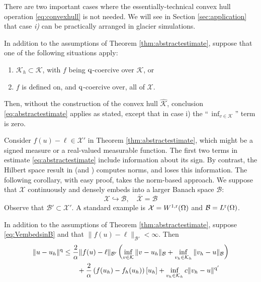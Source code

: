 \documentclass[hidelinks,onefignum,onetabnum,final]{siamart220329}  %
\newcommand{\cB}{\mathcal{B}}
\newcommand{\cK}{\mathcal{K}}
\newcommand{\cX}{\mathcal{X}}
\newcommand{\hcK}{\widehat{\cK}}
\newcommand{\qq}{{\text{\textnormal{q}}}}
\newcommand{\rr}{{\text{\textnormal{r}}}}
\begin{document}
There are two important cases where the essentially-technical convex hull operation \eqref{eq:convexhull} is not needed.  We will see in Section \ref{sec:application} that case \emph{i)} can be practically arranged in glacier simulations.

\begin{corollary}  \label{cor:abstractestimate:nohull}  In addition to the assumptions of Theorem \ref{thm:abstractestimate}, suppose that one of the following situations apply:
\renewcommand{\labelenumi}{\roman{enumi})}
\begin{enumerate}
\item $\cK_h \subset \cK$, with $f$ being $\qq$-coercive over $\cK$, or
\item $f$ is defined on, and $\qq$-coercive over, all of $\cX$.
\end{enumerate}
Then, without the construction of the convex hull $\hcK$, conclusion \eqref{eq:abstractestimate} applies as stated, except that in case i) the ``\,$\inf_{v\in\cK}$'' term is zero.
\end{corollary}

Consider $f(u)-\ell\in \cX'$ in Theorem \ref{thm:abstractestimate}, which might be a signed measure or a real-valued measurable function.  The first two terms in estimate \eqref{eq:abstractestimate} include information about its sign.  By contrast, the Hilbert space result in \cite{Falk1974} (and \cite[section 5.1]{Ciarlet2002}) computes norms, and loses this information.  The following corollary, with easy proof, takes the norm-based approach.  We suppose that $\cX$ continuously and densely embeds into a larger Banach space $\cB$:
\begin{equation}
\cX \hookrightarrow \cB, \quad \bar{\cX} = \cB \label{eq:VembedsinB}
\end{equation}
Observe that $\cB' \subset \cX'$.  A standard example is $\cX=W^{1,\rr}(\Omega)$ and $\cB=L^\rr(\Omega)$.

\begin{corollary}  \label{cor:abstractestimate:Bnorm}  In addition to the assumptions of Theorem \ref{thm:abstractestimate}, suppose \eqref{eq:VembedsinB} and that $\|f(u)-\ell\|_{\cB'} < \infty$.  Then
\begin{align}
\|u-u_h\|^\qq &\le \frac{2}{\alpha} \|f(u)-\ell\|_{\cB'} \left( \inf_{v\in\cK} \|v-u_h\|_{\cB} +   \inf_{v_h\in\cK_h} \|v_h-u\|_{\cB} \right) \label{eq:abstractestimate:Bnorm} \\
   &\qquad + \frac{2}{\alpha} \left(f(u_h)-f_h(u_h)\right)[u_h] + \inf_{v_h\in\cK_h} c \|v_h - u\|^{\qq'} \notag
\end{align}
\end{corollary}
\end{document}
